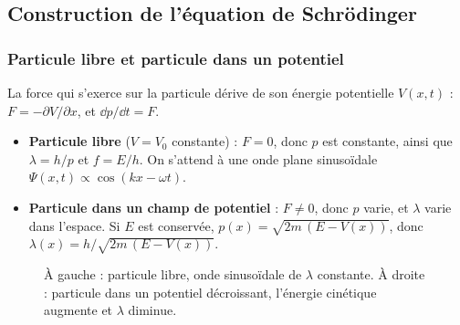 \subsection{Construction de l'équation de Schrödinger}\label{sec:construction}

\subsubsection{Particule libre et particule dans un potentiel}

La force qui s'exerce sur la particule dérive de son énergie potentielle
$V(x,t)$ : $F = -\partial V/\partial x$, et $\dd p/\dd t = F$.

\begin{itemize}
  \item \textbf{Particule libre} ($V = V_0$ constante) : $F = 0$, donc $p$ est
        constante, ainsi que $\lambda = h/p$ et $f = E/h$. On s'attend à une onde
        plane sinusoïdale $\Psi(x,t)\propto\cos(kx-\omega t)$.
  \item \textbf{Particule dans un champ de potentiel} : $F \neq 0$, donc $p$
        varie, et $\lambda$ varie dans l'espace. Si $E$ est conservée,
        $p(x)=\sqrt{2m\,(E-V(x))}$, donc $\lambda(x)=h\big/\sqrt{2m\,(E-V(x))}$.
\end{itemize}

\begin{figure}[!ht]
\centering
\begin{minipage}{0.48\textwidth}
\centering
{}
\end{minipage}\hfill
\begin{minipage}{0.48\textwidth}
\centering
{}
\end{minipage}
\caption{À gauche : particule libre, onde sinusoïdale de $\lambda$ constante.
À droite : particule dans un potentiel décroissant, l'énergie cinétique augmente
et $\lambda$ diminue.}
\end{figure}

